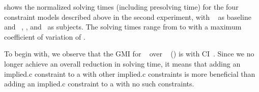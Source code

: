  shows the normalized solving
times (including \gls{presolving} time) for the four \glspl{constraint model}
described above in the second experiment, with ~ as \gls{baseline} and ~, ,
and~ as \glspl{subject}.
%
The solving times range from
\printMinSolvingTime{
  \SolvTechEnableOnlyGoodImpliedConsPrePlusSolvingTimeSpeedupNonePrePlusSolvingTimeAvgMin,
  \SolvTechEnableOnlyGoodImpliedConsPrePlusSolvingTimeSpeedupPrePlusSolvingTimeAvgMin,
  \SolvTechDisableBadImpliedConsPrePlusSolvingTimeSpeedupPrePlusSolvingTimeAvgMin,
  \SolvTechDisableAllImpliedConsPrePlusSolvingTimeSpeedupPrePlusSolvingTimeAvgMin
} to
\printMaxSolvingTime{
  \SolvTechEnableOnlyGoodImpliedConsPrePlusSolvingTimeSpeedupNonePrePlusSolvingTimeAvgMax,
  \SolvTechEnableOnlyGoodImpliedConsPrePlusSolvingTimeSpeedupPrePlusSolvingTimeAvgMax,
  \SolvTechDisableBadImpliedConsPrePlusSolvingTimeSpeedupPrePlusSolvingTimeAvgMax,
  \SolvTechDisableAllImpliedConsPrePlusSolvingTimeSpeedupPrePlusSolvingTimeAvgMax
} with a maximum coefficient of variation of
\numMaxOf{
  \SolvTechEnableOnlyGoodImpliedConsPrePlusSolvingTimeSpeedupNonePrePlusSolvingTimeCvMax,
  \SolvTechEnableOnlyGoodImpliedConsPrePlusSolvingTimeSpeedupPrePlusSolvingTimeCvMax,
  \SolvTechDisableBadImpliedConsPrePlusSolvingTimeSpeedupPrePlusSolvingTimeCvMax,
  \SolvTechDisableAllImpliedConsPrePlusSolvingTimeSpeedupPrePlusSolvingTimeCvMax
}.

To begin with, we observe that the \gls{GMI} for ~ over ~
() is \printGMI{%
  \SolvTechEnableOnlyGoodImpliedConsPrePlusSolvingTimeSpeedupPrePlusSolvingTimeRegularSpeedupGmean%
} with \gls{CI}~\printGMICI{%
  \SolvTechEnableOnlyGoodImpliedConsPrePlusSolvingTimeSpeedupPrePlusSolvingTimeRegularSpeedupCiMin%
}{%
  \SolvTechEnableOnlyGoodImpliedConsPrePlusSolvingTimeSpeedupPrePlusSolvingTimeRegularSpeedupCiMax%
}.
%
Since we no longer achieve an overall reduction in solving time, it means that
adding an \gls{implied.c} \gls{constraint} to a  with
other \gls{implied.c} \glspl{constraint} is more beneficial than adding an
\gls{implied.c} \gls{constraint} to a  with no such
\glspl{constraint}.

